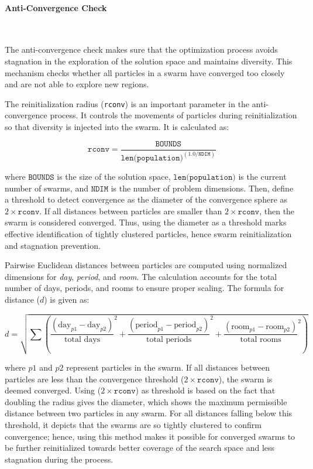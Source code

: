 \paragraph{Anti-Convergence Check}\

The anti-convergence check \cite{Blackwell2006-ms} makes sure that the optimization process avoids stagnation in the exploration of the solution space and maintains diversity. This mechanism checks whether all particles in a swarm have converged too closely and are not able to explore new regions.

The reinitialization radius (\texttt{rconv}) is an important parameter in the anti-convergence process. It controls the movements of particles during reinitialization so that diversity is injected into the swarm. It is calculated as:

\[
\texttt{rconv} = \frac{\texttt{BOUNDS}}{\texttt{len(population)}^{(1.0 / \texttt{NDIM})}}
\]

where \(\texttt{BOUNDS}\) is the size of the solution space, \(\texttt{len(population)}\) is the current number of swarms, and \(\texttt{NDIM}\) is the number of problem dimensions. Then, define a threshold to detect convergence as the diameter of the convergence sphere as \(2 \times \texttt{rconv}\). If all distances between particles are smaller than \(2 \times \texttt{rconv}\), then the swarm is considered converged. Thus, using the diameter as a threshold marks effective identification of tightly clustered particles, hence swarm reinitialization and stagnation prevention.

Pairwise Euclidean distances \cite{ClusterAnalysis2023} between particles are computed using normalized dimensions for \textit{day}, \textit{period}, and \textit{room}. The calculation accounts for the total number of days, periods, and rooms to ensure proper scaling. The formula for distance (\(d\)) is given as:

\[
d = \sqrt{
\sum \left( 
\frac{(\text{day}_{p1} - \text{day}_{p2})}{\text{total days}}^2 +
\frac{(\text{period}_{p1} - \text{period}_{p2})}{\text{total periods}}^2 +
\frac{(\text{room}_{p1} - \text{room}_{p2})}{\text{total rooms}}^2 
\right)
}
\]

where \(p1\) and \(p2\) represent particles in the swarm. If all distances between particles are less than the convergence threshold (\(2 \times \texttt{rconv}\)), the swarm is deemed converged. Using (\(2 \times \texttt{rconv}\)) as threshold is based on the fact that doubling the radius gives the diameter, which shows the maximum permissible distance between two particles in any swarm. For all distances falling below this threshold, it depicts that the swarms are so tightly clustered to confirm convergence; hence, using this method makes it possible for converged swarms to be further reinitialized towards better coverage of the search space and less stagnation during the process.

